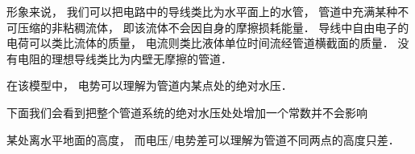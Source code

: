 


形象来说， 我们可以把电路中的导线类比为水平面上的水管， 管道中充满某种不可压缩的非粘稠流体， 即该流体不会因自身的摩擦损耗能量． 导线中自由电子的电荷可以类比流体的质量， 电流则类比液体单位时间流经管道横截面的质量． 没有电阻的理想导线类比为内壁无摩擦的管道．

在该模型中， 电势可以理解为管道内某点处的绝对水压．

下面我们会看到把整个管道系统的绝对水压处处增加一个常数并不会影响

某处离水平地面的高度， 而电压/电势差可以理解为管道不同两点的高度只差．
